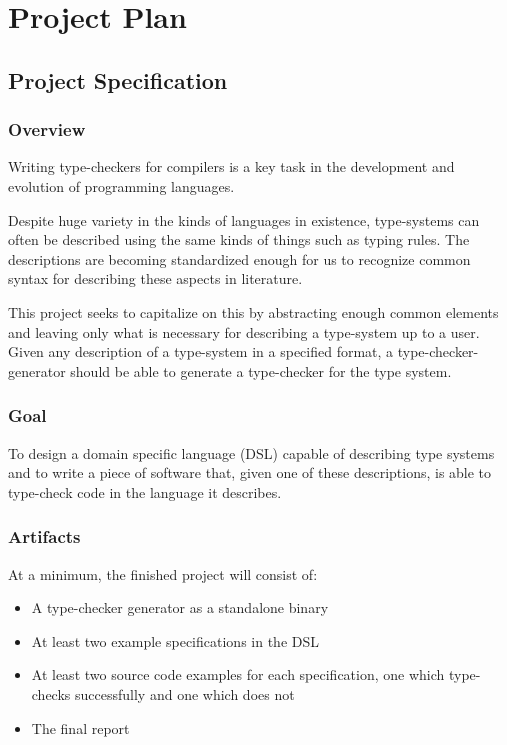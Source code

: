 \chapter{Project Plan}

\section{Project Specification}

  \subsection{Overview}

  Writing type-checkers for compilers is a key task in the
  development and evolution of programming languages.

  Despite huge variety in the kinds of languages in existence,
  type-systems can often be described using the same kinds of
  things such as typing rules. The descriptions are becoming
  standardized enough for us to recognize common syntax for
  describing these aspects in literature.

  This project seeks to capitalize on this by abstracting
  enough common elements and leaving only what is necessary
  for describing a type-system up to a user. Given any
  description of a type-system in a specified format, a
  type-checker-generator should be able to generate a
  type-checker for the type system.
  
  \subsection{Goal}

  To design a domain specific language (DSL) capable of describing type systems and to
  write a piece of software that, given one of these
  descriptions, is able to type-check code in the language
  it describes.

  \subsection{Artifacts}
  \label{section-artifacts}

  At a minimum, the finished project will consist of:

  \begin{itemize}
  \item A type-checker generator as a standalone binary
  \item At least two example specifications in the DSL
  \item At least two source code examples for each
    specification, one which type-checks successfully and one
    which does not
  \item The final report
  \end{itemize}
  
